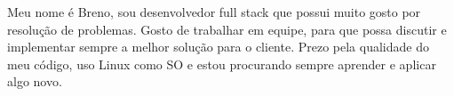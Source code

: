 \documentclass[9pt]{developercv} %
\begin{document}
\vspace{0.3cm}



\begin{minipage}[t]{0.4\textwidth} %
  \vspace{-\baselineskip} %

        Meu nome é Breno, sou desenvolvedor full stack que possui muito gosto por resolução de problemas. Gosto de trabalhar em equipe, para que possa discutir e implementar sempre a melhor solução para o cliente. Prezo pela qualidade do meu código, uso Linux como SO e estou procurando sempre aprender e aplicar algo novo.
\end{minipage}
\hfill %
\begin{minipage}[t]{0.5\textwidth} %
  \vspace{-\baselineskip} %

  \begin{barchart}{5.5}
  \end{barchart}
\end{minipage}

\begin{center}
\end{center}


\end{document}
